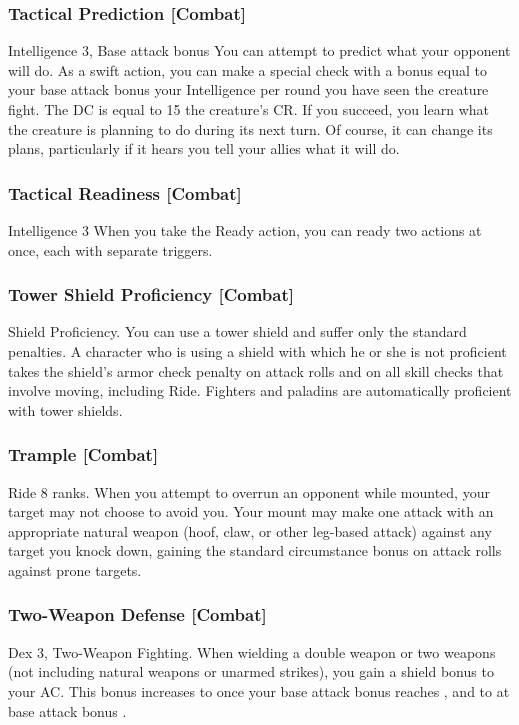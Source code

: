 \subsubsection{Tactical Prediction [Combat]}
 Intelligence 3, Base attack bonus 
 You can attempt to predict what your opponent will do. As a swift action, you can make a special check with a bonus equal to your base attack bonus \add your Intelligence  per round you have seen the creature fight. The DC is equal to 15 \add the creature's CR. If you succeed, you learn what the creature is planning to do during its next turn. Of course, it can change its plans, particularly if it hears you tell your allies what it will do.

\subsubsection{Tactical Readiness [Combat]}
 Intelligence 3
 When you take the Ready action, you can ready two actions at once, each with separate triggers.

\subsubsection{Tower Shield Proficiency [Combat]}
 Shield Proficiency.
 You can use a tower shield and suffer only the standard penalties.
 A character who is using a shield with which he or she is not proficient takes the shield's armor check penalty on attack rolls and on all skill checks that involve moving, including Ride.
 Fighters and paladins are automatically proficient with tower shields.

\subsubsection{Trample [Combat]}
 Ride 8 ranks.
 When you attempt to overrun an opponent while mounted, your target may not choose to avoid you. Your mount may make one attack with an appropriate natural weapon (hoof, claw, or other leg-based attack) against any target you knock down, gaining the standard  circumstance bonus on attack rolls against prone targets.

\subsubsection{Two-Weapon Defense [Combat]}
 Dex 3, Two-Weapon Fighting.
 When wielding a double weapon or two weapons (not including natural weapons or unarmed strikes), you gain a  shield bonus to your AC. This bonus increases to  once your base attack bonus reaches , and to  at base attack bonus .

